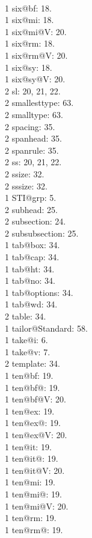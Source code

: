 \\1 six@bf: 18.
\\1 six@mi: 18.
\\1 six@mi@V: 20.
\\1 six@rm: 18.
\\1 six@rm@V: 20.
\\1 six@sy: 18.
\\1 six@sy@V: 20.
\\2 sl: 20, 21, 22.
\\2 smallesttype: 63.
\\2 smalltype: 63.
\\2 spacing: 35.
\\2 spanhead: 35.
\\2 spanrule: 35.
\\2 ss: 20, 21, 22.
\\2 ssize: 32.
\\2 sssize: 32.
\\1 STI@grp: 5.
\\2 subhead: 25.
\\2 subsection: 24.
\\2 subsubsection: 25.
\\1 tab@box: 34.
\\1 tab@cap: 34.
\\1 tab@ht: 34.
\\1 tab@no: 34.
\\1 tab@options: 34.
\\1 tab@wd: 34.
\\2 table: 34.
\\1 tailor@Standard: 58.
\\1 take@i: 6.
\\1 take@v: 7.
\\2 template: 34.
\\1 ten@bf: 19.
\\1 ten@bf@: 19.
\\1 ten@bf@V: 20.
\\1 ten@ex: 19.
\\1 ten@ex@: 19.
\\1 ten@ex@V: 20.
\\1 ten@it: 19.
\\1 ten@it@: 19.
\\1 ten@it@V: 20.
\\1 ten@mi: 19.
\\1 ten@mi@: 19.
\\1 ten@mi@V: 20.
\\1 ten@rm: 19.
\\1 ten@rm@: 19.
